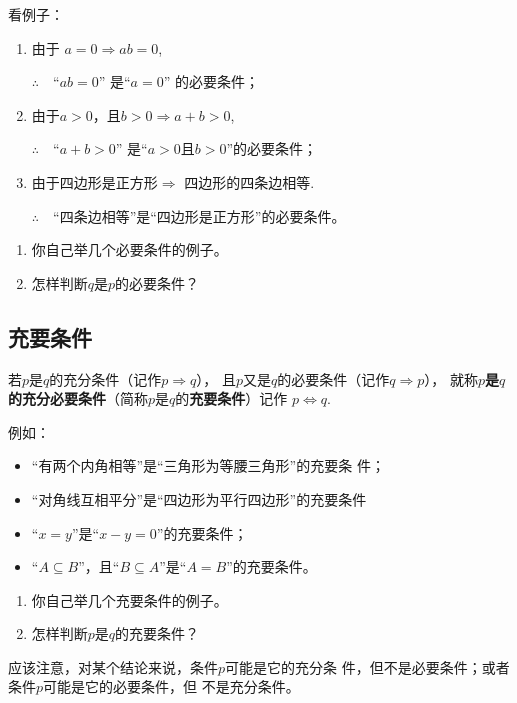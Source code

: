 看例子：
\begin{enumerate}[(1)]
    \item 由于
$a=0\Longrightarrow ab=0$,

$\therefore\quad$“$ab=0$”
是“$a=0$”
的必要条件；
\item 由于$a>0$，且$b>0\Longrightarrow a+b>0$,

$\therefore\quad $“$a+b>0$”
是“$a>0$且$b>0$”的必要条件；
\item 由于四边形是正方形$\Longrightarrow$
四边形的四条边相等.

$\therefore\quad $“四条边相等”是“四边形是正方形”的必要条件。
\end{enumerate}

\begin{blk}
\begin{enumerate}[(1)]
    \item 你自己举几个必要条件的例子。
    \item 怎样判断$q$是$p$的必要条件？
\end{enumerate}
\end{blk}


\subsection{充要条件}

若$p$是$q$的充分条件（记作$p\Longrightarrow q$），
且$p$又是$q$的必要条件（记作$q\Longrightarrow p$），
就称\textbf{$p$是$q$的充分必要条件}（简称$p$是$q$的\textbf{充要条件}）记作
$p\Longleftrightarrow q$.

例如：
\begin{itemize}
\item “有两个内角相等”是“三角形为等腰三角形”的充要条
件；
\item “对角线互相平分”是“四边形为平行四边形”的充要条件
\item “$x=y$”是“$x-y=0$”的充要条件；
\item “$A\subseteq B$”，且“$B\subseteq A$”是“$A=B$”的充要条件。
\end{itemize}

\begin{blk}
   \begin{enumerate}[(1)]
    \item 你自己举几个充要条件的例子。
    \item 怎样判断$p$是$q$的充要条件？
   \end{enumerate} 
\end{blk}

应该注意，对某个结论来说，条件$p$可能是它的充分条
件，但不是必要条件；或者条件$p$可能是它的必要条件，但
不是充分条件。


